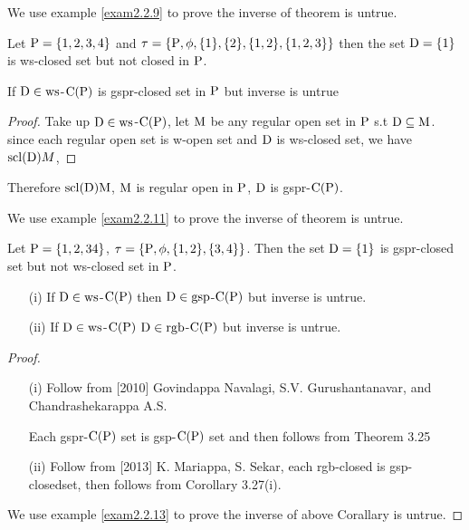 We use example \ref{exam2.2.9} to prove the inverse of theorem is untrue. 

\begin{exm}\label{exam2.2.9}
Let $\mathrm{P}= \{1, 2, 3, 4\}$ and  $\tau= \{\mathrm{P}, \phi, \{1\}, \{2\}, \{1, 2\}, \{1, 2, 3\}\}$ then the set $\mathrm{D} = \{1\}$ is ws-closed set but not closed in $\mathrm{P}$.
\end{exm}

\begin{thm}\label{thm2.2.10}
If $\mathrm{D}\in \mathrm{ws}$-$\mathrm{C}(\mathrm{P})$ is gspr-closed set in $\mathrm{P}$ but inverse is untrue
\end{thm}

\begin{proof}
Take up $\mathrm{D}\in\mathrm{ws}$-$\mathrm{C}(\mathrm{P})$, let $\mathrm{M}$ be any regular open set in $\mathrm{P}$ s.t $\mathrm{D} \subseteq \mathrm{M}$. since each regular open set is w-open set and $\mathrm{D}$ is ws-closed set, we have $\mathrm{scl}(\mathrm{D})M$,
\end{proof}

Therefore $\mathrm{scl}(\mathrm{D})\mathrm{M}$, $\mathrm{M}$ is regular open in $\mathrm{P}$, $\mathrm{D}$ is gspr-$\mathrm{C}(\mathrm{P})$.

We use example \ref{exam2.2.11} to prove the inverse of theorem is untrue.

\begin{exm}\label{exam2.2.11}
Let $\mathrm{P} = \{1, 2, 3 4\}$, $\tau = \{\mathrm{P},\phi,\{1, 2\}, \{3, 4\}\}$. Then the set $\mathrm{D}= \{1\}$ is gspr-closed set but not ws-closed set in $\mathrm{P}$.
\end{exm}

\begin{coro}\label{coro2.2.12}
\begin{itemize}
\item[(i)] If $\mathrm{D}\in \mathrm{ws}$-$\mathrm{C}(\mathrm{P})$ then $\mathrm{D}\in \mathrm{gsp}$-$\mathrm{C}(\mathrm{P})$ but inverse is untrue.
\item[(ii)] If $\mathrm{D}\in \mathrm{ws}$-$\mathrm{C}(\mathrm{P})$ $\mathrm{D}\in \mathrm{rgb}$-$\mathrm{C}(\mathrm{P})$ but inverse is untrue.
\end{itemize}
\end{coro}

\begin{proof}
\begin{itemize}
\item[(i)] Follow from [2010] Govindappa Navalagi, S.V. Gurushantanavar, and Chandrashekarappa A.S.

Each gspr-$\mathrm{C}(\mathrm{P})$ set is gsp-$\mathrm{C}(\mathrm{P})$ set and then follows from Theorem 3.25

\item[(ii)] Follow from [2013] K. Mariappa, S. Sekar, \cite{Mariappa} each rgb-closed is gsp-closedset, then follows from Corollary 3.27(i).
\end{itemize}
We use example \ref{exam2.2.13} to prove the inverse of above Corallary is untrue.
\end{proof}

